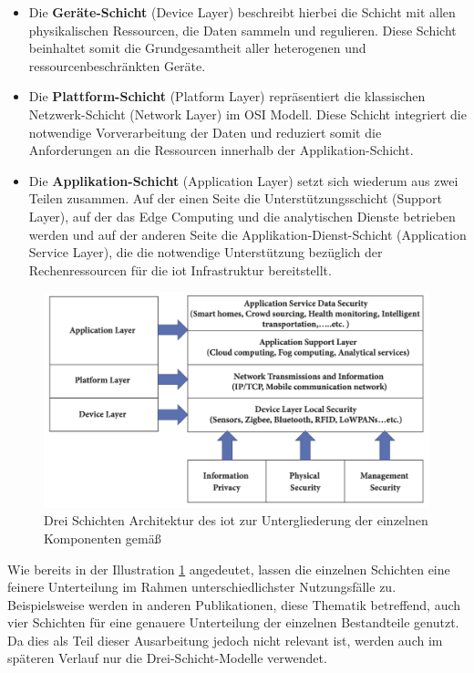 \begin{itemize}
\item Die \textbf{Geräte-Schicht} (Device Layer) beschreibt hierbei die Schicht mit allen physikalischen Ressourcen, die Daten sammeln und regulieren. Diese Schicht beinhaltet somit die Grundgesamtheit aller heterogenen und ressourcenbeschränkten Geräte.
\item Die \textbf{Plattform-Schicht} (Platform Layer) repräsentiert die klassischen Netzwerk-Schicht (Network Layer) im OSI Modell. Diese Schicht integriert die notwendige Vorverarbeitung der Daten und reduziert somit die Anforderungen an die Ressourcen innerhalb der Applikation-Schicht.
\item Die \textbf{Applikation-Schicht} (Application Layer) setzt sich wiederum aus zwei Teilen zusammen. Auf der einen Seite die Unterstützungsschicht (Support Layer), auf der das Edge Computing und die analytischen Dienste betrieben werden und auf der anderen Seite die Applikation-Dienst-Schicht (Application Service Layer), die die notwendige Unterstützung bezüglich der Rechenressourcen für die \ac{iot} Infrastruktur bereitstellt.
\end{itemize}

\begin{figure}
\includegraphics[width=\textwidth]{fundamentals/pictures/IoT_Layer_Architecture}
\caption{Drei Schichten Architektur des \ac{iot} zur Untergliederung der einzelnen Komponenten gemäß \cite{Seliem2018}}
\label{fig:drei-schichten-iot}
\end{figure}

Wie bereits in der Illustration \ref{fig:drei-schichten-iot} angedeutet, lassen die einzelnen Schichten eine feinere Unterteilung im Rahmen unterschiedlichster Nutzungsfälle zu. Beispielsweise werden in anderen Publikationen, diese Thematik betreffend, auch vier Schichten für eine genauere Unterteilung der einzelnen Bestandteile genutzt. Da dies als Teil dieser Ausarbeitung jedoch nicht relevant ist, werden auch im späteren Verlauf nur die Drei-Schicht-Modelle verwendet.

